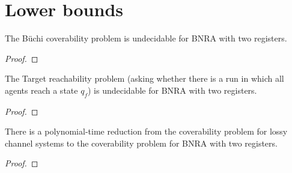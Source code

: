 \section{Lower bounds}

\begin{proposition}
	The Büchi coverability problem is undecidable for BNRA with two registers.
\end{proposition}

\ifproofs
\begin{proof}
\end{proof}
\fi

\begin{proposition}
	The Target reachability problem (asking whether there is a run in which all agents reach a state $q_f$) is undecidable for BNRA with two registers.
\end{proposition}

\ifproofs
\begin{proof}
\end{proof}
\fi

\begin{proposition}
	There is a polynomial-time reduction from the coverability problem for lossy channel systems to the coverability problem for BNRA with two registers.
\end{proposition}

\ifproofs
\begin{proof}
\end{proof}
\fi